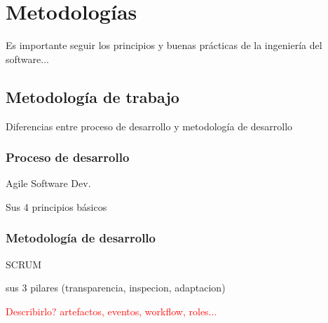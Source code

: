 \chapter{Metodologías}
\label{chap:metodologias}

Es importante seguir los principios y buenas prácticas de la ingeniería del software...

\section{Metodología de trabajo}

Diferencias entre proceso de desarrollo y metodología de desarrollo

\subsection{Proceso de desarrollo}

Agile Software Dev.

Sus 4 principios básicos 

\subsection{Metodología de desarrollo}

SCRUM

sus 3 pilares (transparencia, inspecion, adaptacion)

\textcolor{red}{Describirlo? artefactos, eventos, workflow, roles...}